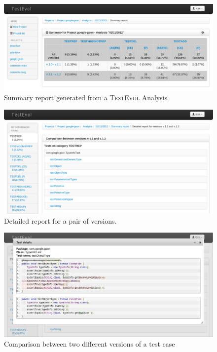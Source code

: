 \documentclass[conference]{IEEEtran}
\newcommand{\tool}{\textsc{TestEvol}\xspace}
\begin{document}
\begin{figure}[t]
	\centering
	\includegraphics[width=\columnwidth]{1-summary}
        \vspace*{-16pt}
	\caption{Summary report generated from a \tool Analysis}
        \vspace*{-8pt}
	\label{fig:summary}
\end{figure}

\begin{figure}[t]
	\centering
	\includegraphics[width=\columnwidth]{2-versiondetails}
        \vspace*{-16pt}
	\caption{Detailed report for a pair of versions.}
        \vspace*{-8pt}
	\label{fig:versiondetails}
\end{figure}

\begin{figure}[t]
	\centering
	\includegraphics[width=\columnwidth]{3-testdetails}
        \vspace*{-16pt}
	\caption{Comparison between two different versions of a test case}
        \vspace*{-8pt}
	\label{fig:testdetails}
\end{figure}
\end{document}
